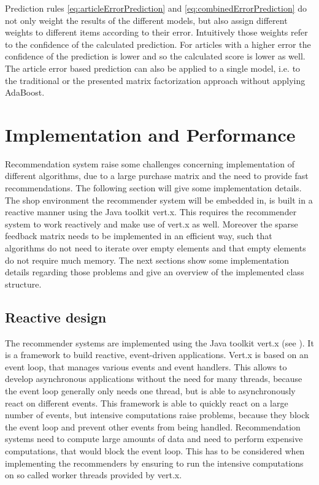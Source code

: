 \documentclass[10pt]{reportMaster}
\begin{document}
Prediction rules \ref{eq:articleErrorPrediction} and \ref{eq:combinedErrorPrediction} do not only weight the results of the different models, but also assign different weights to different items according to their error.
Intuitively those weights refer to the confidence of the calculated prediction.
For articles with a higher error the confidence of the prediction is lower and so the calculated score is lower as well.
The article error based prediction can also be applied to a single model, i.e. to the traditional or the presented matrix factorization approach without applying AdaBoost.









\chapter{Implementation and Performance}
\label{chap:ImplemenationAndPerformance}
Recommendation system raise some challenges concerning implementation of different algorithms, due to a large purchase matrix and the need to provide fast recommendations.
The following section will give some implementation details. 
The shop environment the recommender system will be embedded in, is built in a reactive manner using the Java toolkit vert.x.
This requires the recommender system to work reactively and make use of vert.x as well.
Moreover the sparse feedback matrix needs to be implemented in an efficient way, such that algorithms do not need to iterate over empty elements and that empty elements do not require much memory.
The next sections show some implementation details regarding those problems and give an overview of the implemented class structure.

\section{Reactive design}
\label{sec:ReactiveDesign}
The recommender systems are implemented using the Java toolkit vert.x (see \cite{vertx}).
It is a framework to build reactive, event-driven applications.
Vert.x is based on an event loop, that manages various events and event handlers.
This allows to develop asynchronous applications without the need for many threads, because the event loop generally only needs one thread, but is able to asynchronously react on different events.
This framework is able to quickly react on a large number of events, but intensive computations raise problems, because they block the event loop and prevent other events from being handled.
Recommendation systems need to compute large amounts of data and need to perform expensive computations, that would block the event loop.
This has to be considered when implementing the recommenders by ensuring to run the intensive computations on so called worker threads provided by vert.x.
\end{document}
